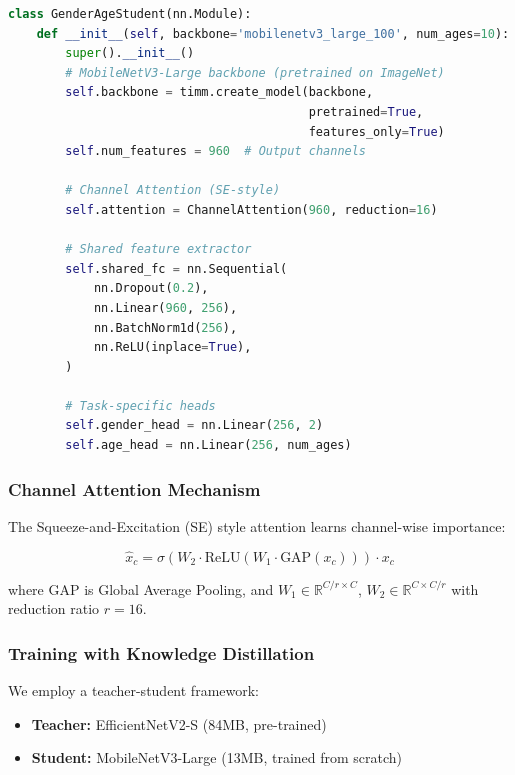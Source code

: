 \documentclass[12pt,a4paper]{article}
\begin{document}
\begin{lstlisting}[language=Python, caption=Model Architecture Definition]
class GenderAgeStudent(nn.Module):
    def __init__(self, backbone='mobilenetv3_large_100', num_ages=10):
        super().__init__()
        # MobileNetV3-Large backbone (pretrained on ImageNet)
        self.backbone = timm.create_model(backbone, 
                                          pretrained=True, 
                                          features_only=True)
        self.num_features = 960  # Output channels
        
        # Channel Attention (SE-style)
        self.attention = ChannelAttention(960, reduction=16)
        
        # Shared feature extractor
        self.shared_fc = nn.Sequential(
            nn.Dropout(0.2),
            nn.Linear(960, 256),
            nn.BatchNorm1d(256),
            nn.ReLU(inplace=True),
        )
        
        # Task-specific heads
        self.gender_head = nn.Linear(256, 2)
        self.age_head = nn.Linear(256, num_ages)
\end{lstlisting}

\subsubsection{Channel Attention Mechanism}

The Squeeze-and-Excitation (SE) style attention learns channel-wise importance:

\begin{equation}
    \hat{x}_c = \sigma\left(W_2 \cdot \text{ReLU}(W_1 \cdot \text{GAP}(x_c))\right) \cdot x_c
\end{equation}

where GAP is Global Average Pooling, and $W_1 \in \mathbb{R}^{C/r \times C}$, $W_2 \in \mathbb{R}^{C \times C/r}$ with reduction ratio $r=16$.

\subsubsection{Training with Knowledge Distillation}

We employ a teacher-student framework:

\begin{itemize}
    \item \textbf{Teacher:} EfficientNetV2-S (84MB, pre-trained)
    \item \textbf{Student:} MobileNetV3-Large (13MB, trained from scratch)
\end{itemize}
\end{document}
